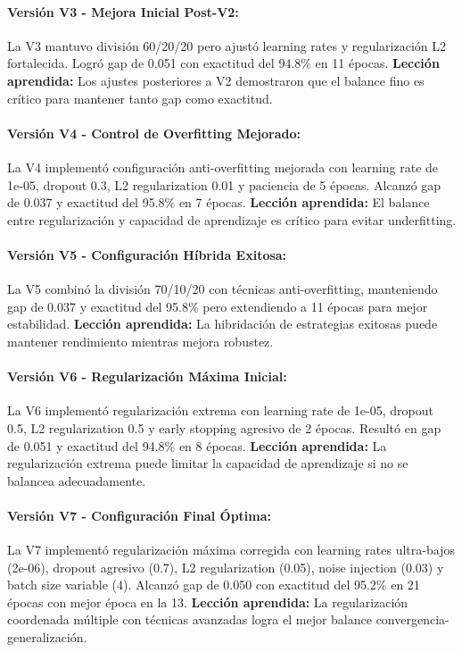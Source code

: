 \paragraph{Versión V3 - Mejora Inicial Post-V2:}
La V3 mantuvo división 60/20/20 pero ajustó learning rates y regularización L2 fortalecida. Logró gap de 0.051 con exactitud del 94.8\% en 11 épocas. \textbf{Lección aprendida:} Los ajustes posteriores a V2 demostraron que el balance fino es crítico para mantener tanto gap como exactitud.

\paragraph{Versión V4 - Control de Overfitting Mejorado:}
La V4 implementó configuración anti-overfitting mejorada con learning rate de 1e-05, dropout 0.3, L2 regularization 0.01 y paciencia de 5 épocas. Alcanzó gap de 0.037 y exactitud del 95.8\% en 7 épocas. \textbf{Lección aprendida:} El balance entre regularización y capacidad de aprendizaje es crítico para evitar underfitting.

\newpage

\paragraph{Versión V5 - Configuración Híbrida Exitosa:}
La V5 combinó la división 70/10/20 con técnicas anti-overfitting, manteniendo gap de 0.037 y exactitud del 95.8\% pero extendiendo a 11 épocas para mejor estabilidad. \textbf{Lección aprendida:} La hibridación de estrategias exitosas puede mantener rendimiento mientras mejora robustez.

\paragraph{Versión V6 - Regularización Máxima Inicial:}
La V6 implementó regularización extrema con learning rate de 1e-05, dropout 0.5, L2 regularization 0.5 y early stopping agresivo de 2 épocas. Resultó en gap de 0.051 y exactitud del 94.8\% en 8 épocas. \textbf{Lección aprendida:} La regularización extrema puede limitar la capacidad de aprendizaje si no se balancea adecuadamente.

\paragraph{Versión V7 - Configuración Final Óptima:}
La V7 implementó regularización máxima corregida con learning rates ultra-bajos (2e-06), dropout agresivo (0.7), L2 regularization (0.05), noise injection (0.03) y batch size variable (4). Alcanzó gap de 0.050 con exactitud del 95.2\% en 21 épocas con mejor época en la 13. \textbf{Lección aprendida:} La regularización coordenada múltiple con técnicas avanzadas logra el mejor balance convergencia-generalización.

